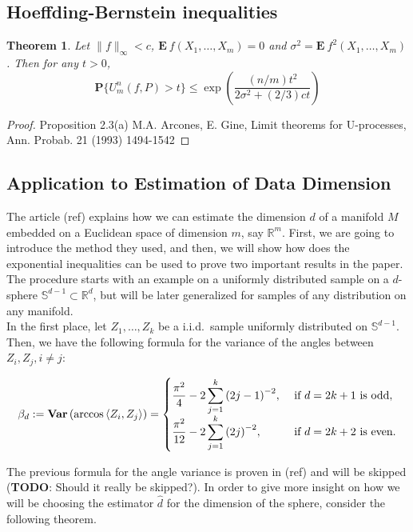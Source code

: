 \documentclass[12pt]{exam}
\def\R{\ensuremath{\mathbb{R}}}
\def\S{\ensuremath{\mathbb{S}}}
\def\E{\ensuremath{\mathbf{E}}\:}
\def\P{\ensuremath{\mathbf{P}}}
\def\Var{\ensuremath{\mathbf{Var}}\,}
\newtheorem{theorem}{Theorem}[section]
\theoremstyle{remark}
\newcommand{\angles}[1]{\ensuremath{\left\langle}#1\ensuremath{\right\rangle} }
\begin{document}
\subsection{Hoeffding-Bernstein inequalities}

\begin{theorem}
  Let $\|f\|_\infty < c$, $\E f(X_1,\ldots, X_m) = 0$ and $\sigma^2 = \E f^2(X_1,\ldots, X_m)$. Then for any $t > 0$,
  \begin{equation}
    \P\{U_m^n(f,P) > t\} \leq \exp \left(\frac{(n/m)t^2}{2\sigma^2 + (2/3)ct}\right)
  \end{equation}
\end{theorem}

\begin{proof}
  Proposition 2.3(a) M.A. Arcones, E. Gine, Limit theorems for U-processes, Ann. Probab. 21 (1993) 1494-1542
\end{proof}


\subsection{Application to Estimation of Data Dimension}
The article (ref) explains how we can estimate the dimension $d$ of a manifold $M$ embedded on a Euclidean space of dimension $m$, say $\R^m$. First, we are going to introduce the method they used, and then, we will show how does the exponential inequalities can be used to prove two important results in the paper. The procedure starts with an example on a uniformly distributed sample on a $d$-sphere $\S^{d-1} \subset \R^d$, but will be later generalized for samples of any distribution on any manifold.\\[4mm]

In the first place, let $Z_1, \ldots, Z_k$ be a i.i.d.\ sample uniformly distributed on $\S^{d-1}$. Then, we have the following formula for the variance of the angles between $Z_i,Z_j, i\neq j$:

\begin{equation}\label{ade:1}\everymath{\displaystyle}
  \beta_d := \Var(\arccos \angles{Z_i,Z_j}) = \begin{cases}
    \frac{\pi^2}{4} - 2 \sum_{j = 1}^{k} {(2j-1)}^{-2}, & \mbox{ if } d = 2k+1 \mbox{ is odd},\\
    \frac{\pi^2}{12}- 2 \sum_{j = 1}^{k} {(2j)}^{-2}, & \mbox{ if } d = 2k+2 \mbox{ is even.}
  \end{cases}
\end{equation}

The previous formula for the angle variance is proven in (ref) and will be skipped (\textbf{TODO}: Should it really be skipped?). In order to give more insight on how we will be choosing the estimator $\widehat{d}$ for the dimension of the sphere, consider the following theorem.
\end{document}
